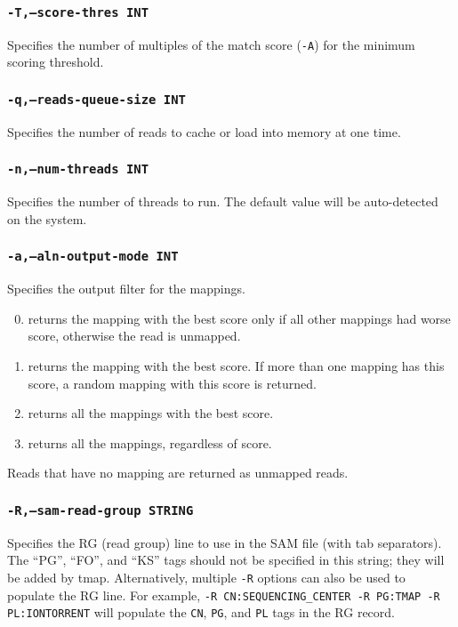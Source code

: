 \documentclass[a4paper,12pt]{book}
\newcommand{\TT}[1]{{\tt #1}} %
\begin{document}
\subsubsection{\TT{-T,--score-thres INT}}
Specifies the number of multiples of the match score (\TT{-A}) for the minimum scoring threshold.

\subsubsection{\TT{-q,--reads-queue-size INT}}
Specifies the number of reads to cache or load into memory at one time.

\subsubsection{\TT{-n,--num-threads INT}}
Specifies the number of threads to run.
The default value will be auto-detected on the system.

\subsubsection{\TT{-a,--aln-output-mode INT}}
Specifies the output filter for the mappings.
\begin{enumerate}
	\setcounter{enumi}{-1} %
	\item returns the mapping with the best score only if all other mappings had worse score, otherwise the read is unmapped.
	\item returns the mapping with the best score.  
		If more than one mapping has this score, a random mapping with this score is returned.
	\item returns all the mappings with the best score.
	\item returns all the mappings, regardless of score.
\end{enumerate}
Reads that have no mapping are returned as unmapped reads.

\subsubsection{\TT{-R,--sam-read-group STRING}}
Specifies the RG (read group) line to use in the SAM file (with tab separators).
The ``PG'', ``FO'', and ``KS'' tags should not be specified in this string; they will be added by tmap.
Alternatively, multiple \TT{-R} options can also be used to populate the RG line. 
For example, \TT{-R CN:SEQUENCING\_CENTER -R PG:TMAP -R PL:IONTORRENT} will populate the \TT{CN}, \TT{PG}, and \TT{PL} tags in the RG record.
\end{document}
